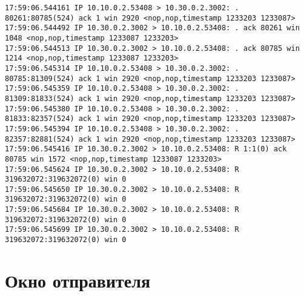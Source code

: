 \documentclass[a4paper,12pt]{article}
\begin{document}
\begin{Verbatim}
17:59:06.544161 IP 10.10.0.2.53408 > 10.30.0.2.3002: . 80261:80785(524) ack 1 win 2920 <nop,nop,timestamp 1233203 1233087>
17:59:06.544492 IP 10.30.0.2.3002 > 10.10.0.2.53408: . ack 80261 win 1048 <nop,nop,timestamp 1233087 1233203>
17:59:06.544513 IP 10.30.0.2.3002 > 10.10.0.2.53408: . ack 80785 win 1214 <nop,nop,timestamp 1233087 1233203>
17:59:06.545314 IP 10.10.0.2.53408 > 10.30.0.2.3002: . 80785:81309(524) ack 1 win 2920 <nop,nop,timestamp 1233203 1233087>
17:59:06.545359 IP 10.10.0.2.53408 > 10.30.0.2.3002: . 81309:81833(524) ack 1 win 2920 <nop,nop,timestamp 1233203 1233087>
17:59:06.545380 IP 10.10.0.2.53408 > 10.30.0.2.3002: . 81833:82357(524) ack 1 win 2920 <nop,nop,timestamp 1233203 1233087>
17:59:06.545394 IP 10.10.0.2.53408 > 10.30.0.2.3002: . 82357:82881(524) ack 1 win 2920 <nop,nop,timestamp 1233203 1233087>
17:59:06.545416 IP 10.30.0.2.3002 > 10.10.0.2.53408: R 1:1(0) ack 80785 win 1572 <nop,nop,timestamp 1233087 1233203>
17:59:06.545624 IP 10.30.0.2.3002 > 10.10.0.2.53408: R 319632072:319632072(0) win 0
17:59:06.545650 IP 10.30.0.2.3002 > 10.10.0.2.53408: R 319632072:319632072(0) win 0
17:59:06.545684 IP 10.30.0.2.3002 > 10.10.0.2.53408: R 319632072:319632072(0) win 0
17:59:06.545699 IP 10.30.0.2.3002 > 10.10.0.2.53408: R 319632072:319632072(0) win 0
\end{Verbatim}

\section{Окно отправителя}
\end{document}

